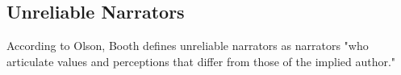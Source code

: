 \subsection{Unreliable Narrators}
According to Olson, Booth defines unreliable narrators as narrators "who articulate values and perceptions that differ from those of the implied author."\cite[p. 94]{Olson} 